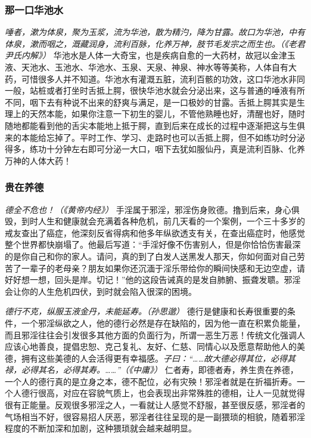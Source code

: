 \subsubsection{那一口华池水}

\textit{唾者，漱为体泉，聚为玉浆，流为华池，散为精汋，降为甘露。故口为华池，中有体泉，漱而咽之，溉藏润身，流利百脉，化养万神，肢节毛发宗之而生也。（《老君尹氏内解》）} 华池水是人体一大奇宝，也是疾病自愈的一大药材，故冠以金津玉液、天池水、玉池水、华池水、玉泉、天泉、神泉、神水等等美称，人体自有大药，可惜很多人并不知道。华池水有灌溉五脏，流利百骸的功效，这口华池水非同一般，站桩或者打坐时舌抵上腭，很快华池水就会分泌出来，这与普通的唾液有所不同，咽下去有种说不出来的舒爽与满足，是一口极妙的甘露。舌抵上腭其实是生理上的天然本能，如果你注意一下初生的婴儿，不管他熟睡也好，清醒也好，随时随地都能看到他的舌尖本能地上抵于腭，直到后来在成长的过程中逐渐把这与生俱来的本能给忘掉了。平时工作、学习、走路时也可以舌抵上腭，但不如练功时分泌得多，练功十分钟左右即可分泌一大口，咽下去犹如服仙丹，真是流利百脉、化养万神的人体大药！

\subsubsection{贵在养德}

\textit{德全不危也！（《黄帝内经》）} 手淫属于邪淫，邪淫伤身败德。撸到后来，身心俱毁，到时人生和健康就会充满着各种危机，前几天看的一个案例，一个三十多岁的戒友查出了癌症，他深刻反省得病和他多年纵欲透支有关，在查出癌症时，他感觉整个世界都快崩塌了。他最后写道：“手淫好像不伤害别人，但是你恰恰伤害最深的是你自己和你的家人。请问，真的到了白发人送黑发人那天，你如何面对自己劳苦了一辈子的老母亲？朋友如果你还沉湎于淫乐带给你的瞬间快感和无边空虚，请好好想一想，回头是岸。切记！”他的这段告诫真的是发自肺腑、振聋发聩。邪淫会让你的人生危机四伏，到时就会陷入很深的困境。

\textit{德行不克，纵服玉液金丹，未能延寿。（孙思邈）} 德行是健康和长寿很重要的条件，一个邪淫纵欲之人，他的德行必然是存在缺陷的，因为他一直在积累负能量，而且邪淫往往会引发很多其他方面的负面行为，所谓一恶生万恶！传统文化强调人应该心地善良，提倡忠恕、克己复礼、友好、仁慈、同情心以及愿意帮助他人的美德，拥有这些美德的人会活得更有幸福感。\textit{子曰：“……故大德必得其位，必得其禄，必得其名，必得其寿。……”（《中庸》）} 仁者寿，即德者寿，养生贵在养德，一个人的德行真的是立身之本，德不配位，必有灾殃！邪淫者就是在折福折寿。一个人德行很高，对应在容貌气质上，也会表现出非常殊胜的德相，让人一见就觉得很有正能量。反观很多邪淫之人，一看就让人感觉不舒服，甚至很反感，邪淫者的气场相当不好，很容易招人厌恶，邪淫者往往呈现的是一副猥琐的相貌，随着邪淫程度的不断加深和加剧，这种猥琐就会越来越明显。

